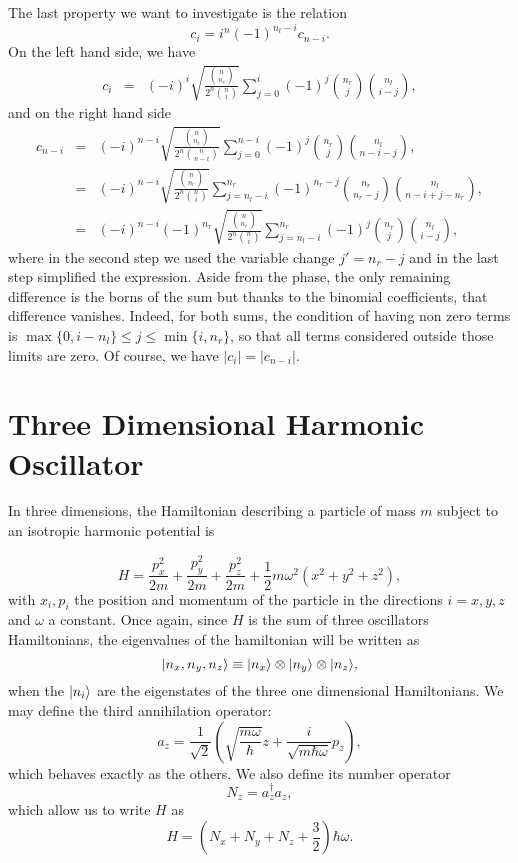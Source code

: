 The last property we want to investigate is the relation
\[ c_i = i^n (-1)^{n_l-i} c_{n-i} . \]
On the left hand side, we have
\begin{eqnarray}
    c_i&=& (-i)^i  \sqrt{\frac{\binom{n}{n_r} }{2^n \binom{n}{i}}}  \sum_{j=0}^{i}(-1)^j \binom{n_r}{j} \binom{n_l}{i-j} ,
\end{eqnarray}
and on the right hand side
\begin{eqnarray}
    c_{n-i}&=&  (-i)^{n-i} \sqrt{\frac{\binom{n}{n_r} }{2^n \binom{n}{n-i}}}    \sum_{j=0}^{n-i}(-1)^j \binom{n_r}{j} \binom{n_l}{n-i-j} , \\
    &=&  (-i)^{n-i}  \sqrt{\frac{\binom{n}{n_r} }{2^n \binom{n}{i}}}    \sum_{j=n_l-i}^{n_r}(-1)^{n_r-j} \binom{n_r}{n_r-j} \binom{n_l}{n-i+j-n_r} , \\
    &=&  (-i)^{n-i} (-1)^{n_r}  \sqrt{\frac{\binom{n}{n_r} }{2^n \binom{n}{i}}}    \sum_{j=n_l-i}^{n_r}(-1)^{j} \binom{n_r}{j} \binom{n_l}{i-j} ,
\end{eqnarray}
where in the second step we used the variable change $j'=n_r-j$ and in the last step simplified the expression. Aside from the phase, the only remaining difference is the borns of the sum but thanks to the binomial coefficients, that difference vanishes. Indeed, for both sums, the condition of having non zero terms is $\max\{ 0, i- n_l\} \le j \le \min\{ i,n_r \} $, so that all terms considered outside those limits are zero. Of course, we have $|c_i|=|c_{n-i}|$.


\section{Three Dimensional Harmonic Oscillator}

In three dimensions, the Hamiltonian describing a particle of mass $m$ subject to an isotropic harmonic potential is

\[ H =  \frac{p_x^2}{2m}+\frac{p_y^2}{2m} + \frac{p_z^2}{2m}+ \frac 1 2 m \omega^2 \left( x^2 + y^2 +z^2\right),\]
with $x_i, p_i$ the position and momentum of the particle in the directions $i=x,y,z$ and $\omega$ a constant. Once again, since $H$ is the sum of three oscillators Hamiltonians, the eigenvalues of the hamiltonian will be written as
\[ | n_x, n_y,n_z \rangle \equiv | n_x \rangle \otimes | n_y \rangle \otimes | n_z \rangle, \]
when the $| n_i \rangle$ are the eigenstates of the three one dimensional Hamiltonians. We may define the third annihilation operator:
\[ a_z = \frac{1}{\sqrt 2} \left( \sqrt{\frac{m\omega}{\hbar}} z + \frac{i}{\sqrt{m \hbar \omega}} p_z \right),\]
which behaves exactly as the others. We also define its number operator
\[ N_z = a_z^\dagger a_z, \]
which allow us to write $H$ as
\[ H = \left(N_x + N_y + N_z +\frac 3 2 \right) \hbar \omega. \]

